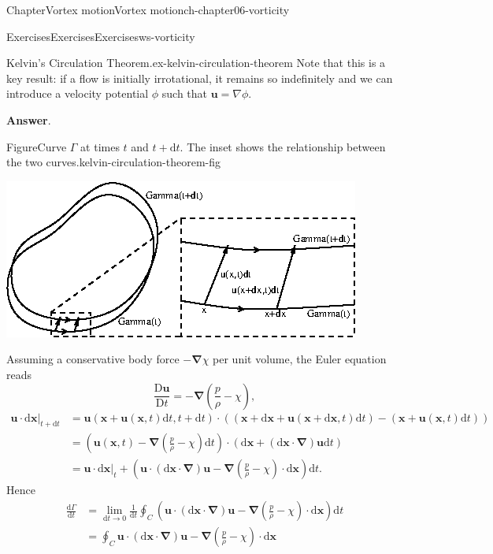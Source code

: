 \documentclass[oneside,10pt,]{book}
\newcommand{\blocktitlefont}{\relax}
\numberwithin{equation}{section}
\newcommand{\de}{\mathrm{d}}
\newcommand{\dd}[2]{\frac{\de#1}{\de#2}}
\newcommand{\DD}[2]{\frac{\mathrm{D}#1}{\mathrm{D}#2}}
\newcommand{\bx}{\boldsymbol{x}}
\newcommand{\bu}{\boldsymbol{u}}
\newcommand{\bnabla}{\boldsymbol{\nabla}}
\newcommand{\amp}{&}
\begin{document}
\begin{chapterptx}{Chapter}{Vortex motion}{}{Vortex motion}{}{}{ch-chapter06-vorticity}
\begin{exercises-section}{Exercises}{Exercises}{}{Exercises}{}{}{ws-vorticity}
\begin{divisionexercise}{1}{Kelvin’s Circulation Theorem.}{}{ex-kelvin-circulation-theorem}
Note that this is a key result: if a flow is initially irrotational, it remains so indefinitely and we can introduce a velocity potential \(\phi\) such that \(\mathbf{u} = \nabla \phi\).%
\par\smallskip%
\noindent\textbf{\blocktitlefont Answer}.\hypertarget{ex-kelvin-circulation-theorem-3}{}\quad{}\begin{figureptx}{Figure}{Curve \(\Gamma\) at times \(t\) and \(t+\de t\). The inset shows the relationship between the two curves.}{kelvin-circulation-theorem-fig}{}%
\begin{image}{0.1}{0.8}{0.1}{}%
\includegraphics[width=\linewidth]{external/ch-chapter03-kelvin-circulation.png}
\end{image}%
\tcblower
\end{figureptx}%
Assuming a conservative body force \(-\bnabla\chi\) per unit volume, the Euler equation reads%
\begin{equation*}
\DD{\bu}{t}=-\bnabla\left(\frac{p}{\rho}-\chi\right),
\end{equation*}
%
\begin{align*}
\left.\bu\cdot\de\bx\right|_{t+\de t}\amp=\bu(\bx+\bu(\bx,t)\de t,t+\de t)\cdot\left((\bx+\de\bx+\bu(\bx+\de\bx,t)\de t)-(\bx+\bu(\bx,t)\de t)\right)\\
\amp=\left(\bu(\bx,t)-\bnabla\left(\frac{p}{\rho}-\chi\right)\de t\right)\cdot\left(\de\bx+(\de\bx\cdot\bnabla)\bu\de t\right)\\
\amp=\left.\bu\cdot\de\bx\right|_{t}+\left(\bu\cdot(\de\bx\cdot\bnabla)\bu-\bnabla\left(\frac{p}{\rho}-\chi\right)\cdot\de\bx\right)\de t.
\end{align*}
Hence%
\begin{align*}
\dd{\Gamma}{t}\amp=\lim_{\de t\rightarrow0}\frac1{\de t}\oint_C\left(\bu\cdot(\de\bx\cdot\bnabla)\bu-\bnabla\left(\frac{p}{\rho}-\chi\right)\cdot\de\bx\right)\de t\\
\amp=\oint_C\bu\cdot(\de\bx\cdot\bnabla)\bu-\bnabla\left(\frac{p}{\rho}-\chi\right)\cdot\de\bx\\

\end{align*}
\end{divisionexercise}
\end{exercises-section}
\end{chapterptx}
\end{document}
